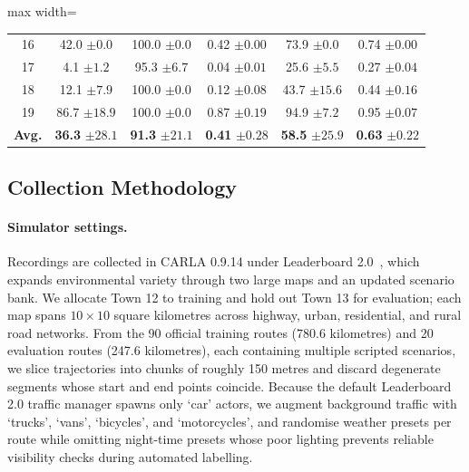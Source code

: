 \begin{table}[!tp]
\begin{adjustbox}{max width=\textwidth}
\begin{tabular}{c|c|c|c|c|c}
    16 & 42.0 {\color{gray}\footnotesize $\pm 0.0$} & 100.0 {\color{gray}\footnotesize $\pm 0.0$} & 0.42 {\color{gray}\footnotesize $\pm 0.00$} & 73.9 {\color{gray}\footnotesize $\pm 0.0$} & 0.74 {\color{gray}\footnotesize $\pm 0.00$} \\
    17 & 4.1 {\color{gray}\footnotesize $\pm 1.2$} & 95.3 {\color{gray}\footnotesize $\pm 6.7$} & 0.04 {\color{gray}\footnotesize $\pm 0.01$} & 25.6 {\color{gray}\footnotesize $\pm 5.5$} & 0.27 {\color{gray}\footnotesize $\pm 0.04$} \\
    18 & 12.1 {\color{gray}\footnotesize $\pm 7.9$} & 100.0 {\color{gray}\footnotesize $\pm 0.0$} & 0.12 {\color{gray}\footnotesize $\pm 0.08$} & 43.7 {\color{gray}\footnotesize $\pm 15.6$} & 0.44 {\color{gray}\footnotesize $\pm 0.16$} \\
    19 & 86.7 {\color{gray}\footnotesize $\pm 18.9$} & 100.0 {\color{gray}\footnotesize $\pm 0.0$} & 0.87 {\color{gray}\footnotesize $\pm 0.19$} & 94.9 {\color{gray}\footnotesize $\pm 7.2$} & 0.95 {\color{gray}\footnotesize $\pm 0.07$} \\
    \midrule
    \textbf{Avg.} & \textbf{36.3} {\color{gray}\footnotesize $\pm 28.1$} & \textbf{91.3} {\color{gray}\footnotesize $\pm 21.1$} & \textbf{0.41} {\color{gray}\footnotesize $\pm 0.28$} & \textbf{58.5} {\color{gray}\footnotesize $\pm 25.9$} & \textbf{0.63} {\color{gray}\footnotesize $\pm 0.22$} \\
    \bottomrule
  \end{tabular}
  \end{adjustbox}
\end{table}

\subsection{Collection Methodology}\label{drivelm:app:carla_collection}

\paragraph{Simulator settings.}
Recordings are collected in CARLA 0.9.14 under Leaderboard 2.0~\cite{dosovitskiy2017carla}, which expands environmental variety through two large maps and an updated scenario bank. We allocate Town 12 to training and hold out Town 13 for evaluation; each map spans $10\times10$ square kilometres across highway, urban, residential, and rural road networks. From the 90 official training routes (780.6 kilometres) and 20 evaluation routes (247.6 kilometres), each containing multiple scripted scenarios, we slice trajectories into chunks of roughly 150 metres and discard degenerate segments whose start and end points coincide. Because the default Leaderboard 2.0 traffic manager spawns only `car' actors, we augment background traffic with `trucks', `vans', `bicycles', and `motorcycles', and randomise weather presets per route while omitting night-time presets whose poor lighting prevents reliable visibility checks during automated labelling.

